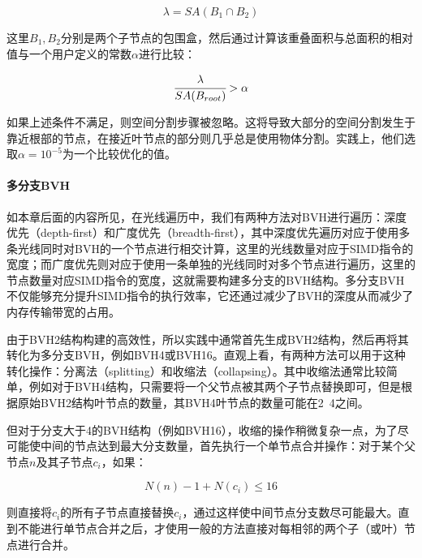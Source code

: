 \begin{equation}
	\lambda=SA(B_1\cap B_2)
\end{equation}

\noindent 这里$B_1,B_2$分别是两个子节点的包围盒，然后通过计算该重叠面积与总面积的相对值与一个用户定义的常数$\alpha$进行比较：

\begin{equation}
	 \cfrac{\lambda}{SA(B_{root})}>\alpha
\end{equation}

如果上述条件不满足，则空间分割步骤被忽略。这将导致大部分的空间分割发生于靠近根部的节点，在接近叶节点的部分则几乎总是使用物体分割。实践上，他们选取$\alpha=10^{-5}$为一个比较优化的值。







\paragraph{多分支BVH}
如本章后面的内容所见，在光线遍历中，我们有两种方法对BVH进行遍历：深度优先（depth-first）和广度优先（breadth-first），其中深度优先遍历对应于使用多条光线同时对BVH的一个节点进行相交计算，这里的光线数量对应于SIMD指令的宽度；而广度优先则对应于使用一条单独的光线同时对多个节点进行遍历，这里的节点数量对应SIMD指令的宽度，这就需要构建多分支的BVH结构。多分支BVH不仅能够充分提升SIMD指令的执行效率，它还通过减少了BVH的深度从而减少了内存传输带宽的占用。

由于BVH2结构构建的高效性，所以实践中通常首先生成BVH2结构，然后再将其转化为多分支BVH，例如BVH4或BVH16。直观上看，有两种方法可以用于这种转化操作：分离法（splitting）和收缩法（collapsing）。其中收缩法通常比较简单，例如对于BVH4结构\cite{a:EfficientRayTracingKernelsforModernCPUArchitectures}，只需要将一个父节点被其两个子节点替换即可，但是根据原始BVH2结构叶节点的数量，其BVH4叶节点的数量可能在2~4之间。

但对于分支大于4的BVH结构（例如BVH16），收缩的操作稍微复杂一点，为了尽可能使中间的节点达到最大分支数量，\cite{a:GettingRidofPackets}首先执行一个单节点合并操作：对于某个父节点$n$及其子节点$c_i$，如果：

\begin{equation}
	N(n)-1+N(c_i)\leq 16
\end{equation}

\noindent 则直接将$c_i$的所有子节点直接替换$c_i$，通过这样使中间节点分支数尽可能最大。直到不能进行单节点合并之后，才使用一般的方法直接对每相邻的两个子（或叶）节点进行合并。

